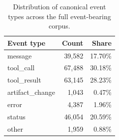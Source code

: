 \begin{table}[t]
\centering
\small
\begin{tabular}{lrr}
\toprule
Event type & Count & Share \\
\midrule
message & 39,582 & 17.70\% \\
tool\_call & 67,488 & 30.18\% \\
tool\_result & 63,145 & 28.23\% \\
artifact\_change & 1,043 & 0.47\% \\
error & 4,387 & 1.96\% \\
status & 46,054 & 20.59\% \\
other & 1,959 & 0.88\% \\
\bottomrule
\end{tabular}
\caption{Distribution of canonical event types across the full event-bearing corpus.}
\label{tab:event_distribution}
\end{table}

